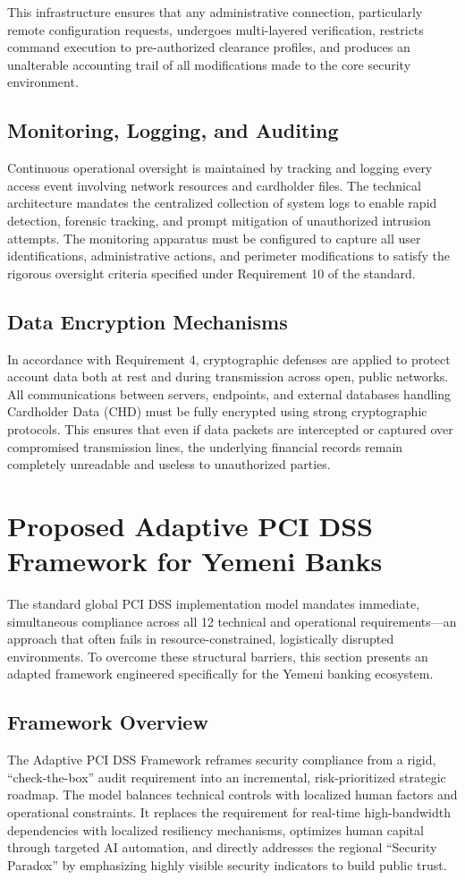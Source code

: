 \documentclass[12pt,a4paper,oneside]{report}
\begin{document}
	This infrastructure ensures that any administrative connection, particularly remote configuration requests, undergoes multi-layered verification, restricts command execution to pre-authorized clearance profiles, and produces an unalterable accounting trail of all modifications made to the core security environment.
	
	\subsection{Monitoring, Logging, and Auditing}
	Continuous operational oversight is maintained by tracking and logging every access event involving network resources and cardholder files. The technical architecture mandates the centralized collection of system logs to enable rapid detection, forensic tracking, and prompt mitigation of unauthorized intrusion attempts. The monitoring apparatus must be configured to capture all user identifications, administrative actions, and perimeter modifications to satisfy the rigorous oversight criteria specified under Requirement 10 of the standard.
	
	\subsection{Data Encryption Mechanisms}
	In accordance with Requirement 4, cryptographic defenses are applied to protect account data both at rest and during transmission across open, public networks. All communications between servers, endpoints, and external databases handling Cardholder Data (CHD) must be fully encrypted using strong cryptographic protocols. This ensures that even if data packets are intercepted or captured over compromised transmission lines, the underlying financial records remain completely unreadable and useless to unauthorized parties.
	
	\section{Proposed Adaptive PCI DSS Framework for Yemeni Banks}
	The standard global PCI DSS implementation model mandates immediate, simultaneous compliance across all 12 technical and operational requirements—an approach that often fails in resource-constrained, logistically disrupted environments. To overcome these structural barriers, this section presents an adapted framework engineered specifically for the Yemeni banking ecosystem.
	
	\subsection{Framework Overview}
	The Adaptive PCI DSS Framework reframes security compliance from a rigid, ``check-the-box'' audit requirement into an incremental, risk-prioritized strategic roadmap. The model balances technical controls with localized human factors and operational constraints. It replaces the requirement for real-time high-bandwidth dependencies with localized resiliency mechanisms, optimizes human capital through targeted AI automation, and directly addresses the regional ``Security Paradox'' by emphasizing highly visible security indicators to build public trust.
	
\end{document}
